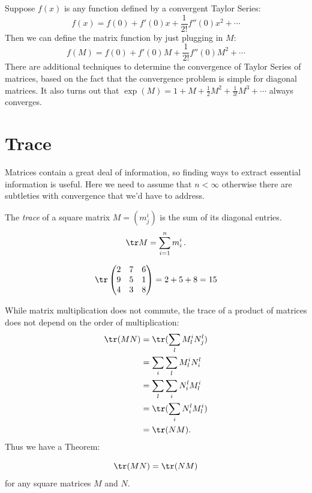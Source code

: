 Suppose $f(x)$ is any function defined by a convergent Taylor Series:
\[
f(x) = f(0) + f'(0)x + \frac{1}{2!}f''(0)x^2 + \cdots
\]
Then we can define the matrix function by just plugging in $M$:
\[
f(M) = f(0) + f'(0)M + \frac{1}{2!}f''(0)M^2 + \cdots
\]
There are additional techniques to determine the convergence of Taylor Series of matrices, based on the fact that the convergence problem is simple for diagonal matrices.  It also turns out that $\exp (M) = 1 + M + \frac{1}{2}M^2 + \frac{1}{3!}M^3 + \cdots$ always converges.



\section{Trace}

Matrices contain a great deal of information, so finding ways to extract essential information is useful. Here we need to assume that $n < \infty$ otherwise there are subtleties with convergence that we'd have to address.

\begin{definition}
The \emph{trace} of a square matrix $M=(m_j^i)$ is the sum of its diagonal entries.
\[
\tr M = \sum_{i=1}^{n}m_i^i\, .
\]
\end{definition}

\begin{example}
\[
\tr \begin{pmatrix}
2 & 7 & 6\\
9 & 5 & 1\\
4 & 3 & 8\\
\end{pmatrix} = 2+5+8 = 15
\]
\end{example}
While matrix multiplication does not commute, the trace of a product of matrices does not depend on the order of multiplication:
\begin{align*}
\tr(MN) & = \tr( \sum_l M_l^i N_j^l ) \\
& = \sum_i \sum_l M_l^i N_i^l \\
& = \sum_l \sum_i N_i^l M_l^i \\
& = \tr( \sum_i N_i^l M_l^i ) \\
& = \tr( NM ).
\end{align*}
Thus we have a Theorem:
\begin{theorem} \[\tr(MN)=\tr(NM)\] for any square matrices $M$ and $N$.
\end{theorem}

